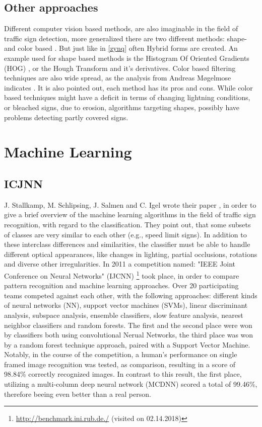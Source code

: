 \subsection{Other approaches}
Different computer vision based methods, are also imaginable in the field of traffic sign detection, more generalized there are two different methods: shape- and color based \cite{moglemose}. But just like in \ref{zynq} often Hybrid forms are created. An example used for shape based methods is the Histogram Of Oriented Gradients (HOG) \cite{hogex}, or the Hough Transform and it's derivatives. Color based filtering techniques are also wide spread, as the analysis from Andreas Møgelmose indicates \cite{moglemose}. 
It is also pointed out, each method has its pros and cons. While color based techniques might have a deficit in terms of changing lightning conditions, or bleached signs, due to erosion, algorithms targeting shapes, possibly have problems detecting partly covered signs. 


\section{Machine Learning}
\subsection{ICJNN}\label{ssec:machinelearning}

J. Stallkamp, M. Schlipsing, J. Salmen and C. Igel wrote their paper \cite{machinelearning}, in order to give a brief overview of the machine learning algorithms in the field of traffic sign recognition, with regard to the classification. \newline
They point out, that some subsets of classes are
very similar to each other (e.g., speed limit signs). In addition to these interclass differences and similarities, the classifier must be able to handle different optical appearances, like changes in lighting, partial occlusions, rotations and diverse other irregularities. In 2011 a competition named: "IEEE Joint
Conference on Neural Networks" (IJCNN) \footnote{\url{http://benchmark.ini.rub.de./} (visited on 02.14.2018)} took place, in order to compare pattern recognition and machine learning approaches. Over 20 participating teams competed against each other, with the following approaches: different kinds of neural
networks (NN), support vector machines (SVMs), linear discriminant analysis, subspace analysis, ensemble classifiers, slow feature analysis, nearest neighbor classifiers and random forests. \newline
The first and the second place were won by classifiers both using convolutional Nerual Networks, the third place was won by a random forest technique approach, paired with a Support Vector Machine. Notably, in the course of the competition, a human's performance on single framed image recognition was tested, as comparison, resulting in a score of 98.84\% correctly recognized images. In contrast to this result, the first place, utilizing a multi-column deep neural network (MCDNN) scored a total of 99.46\%, therefore beeing even better than a real person. 


